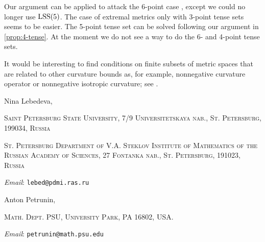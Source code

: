 \documentclass{article}
\makeatletter
\newcommand{\Addresses}{{\bigskip\footnotesize

\noindent Nina Lebedeva,
\par\nopagebreak
 \textsc{Saint Petersburg State University, 7/9 Universitetskaya nab., St. Petersburg, 199034, Russia}
\par
\nopagebreak
 \textsc{St. Petersburg Department of V.A. Steklov Institute of Mathematics of the Russian Academy of Sciences, 27 Fontanka nab., St. Petersburg, 191023, Russia}
  \par\nopagebreak
  \textit{Email}: \texttt{lebed@pdmi.ras.ru}

\medskip

\noindent   Anton Petrunin, 
\par\nopagebreak
 \textsc{Math. Dept. PSU, University Park, PA 16802, USA.}
  \par\nopagebreak
  \textit{Email}: \texttt{petrunin@math.psu.edu}
  
}}
\makeatother
\begin{document}
Our argument can be applied to attack the 6-point case \cite[Question~6.3]{lebedeva-petrunin}, except we could no longer use $\mathrm{LSS}(5)$.
The case of extremal metrics only with 3-point tense sets seems to be easier. 
The 5-point tense set can be solved following our argument in \ref{prop:4-tense}.
At the moment we do not see a way to do the 6- and 4-point tense sets.

It would be interesting to find conditions on finite subsets of metric spaces that are related to other curvature bounds as, for example, nonnegative curvature operator or nonnegative isotropic curvature; see \cite[1.19$_+(e)$]{gromov}.


{\sloppy
\printbibliography[heading=bibintoc]
\fussy
}

\Addresses
\end{document}
